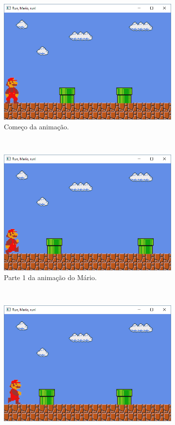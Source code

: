 \begin{renumerate}
  \begin{figure}[H]
    \centering
    \begin{subfigure}[t]{0.3\textwidth}
        \centerline{\includegraphics[width=.9\textwidth]{img/cap1_ex25}}
        \caption{Começo da animação.}
        \label{fig:cap01_ex6a}
    \end{subfigure}
    ~
    \begin{subfigure}[t]{0.3\textwidth}
        \centerline{\includegraphics[width=.9\textwidth]{img/cap1_ex25b}}
        \caption{Parte 1 da animação do Mário.}
        \label{fig:cap01_ex6b}
    \end{subfigure}
    ~
    \begin{subfigure}[t]{0.3\textwidth}
        \centerline{\includegraphics[width=.9\textwidth]{img/cap1_ex25c}}

\end{subfigure}
\end{figure}
\end{renumerate}
